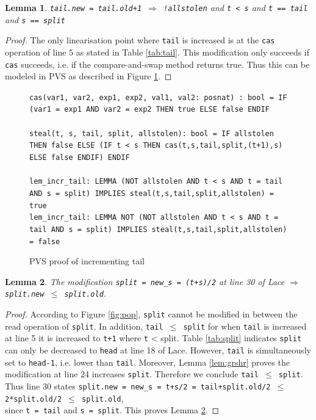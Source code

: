 \documentclass{sig-alternate-br}
\newtheorem{lemma}{Lemma}
\begin{document}
\begin{lemma}
	\texttt{tail.new = tail.old+1 $\Rightarrow$ !allstolen} and \texttt{t < s} and \texttt{t == tail} and \texttt{s == split}
	\label{lem:incrtail}
\end{lemma}
\begin{proof}
	The only linearisation point where \texttt{tail} is increased is at the \texttt{cas} operation of line 5 as stated in Table \ref{tab:tail}. This modification only succeeds if \texttt{cas} succeeds, i.e. if the compare-and-swap method returns true. Thus this can be modeled in PVS as described in Figure \ref{pvs:tailincr}.
\end{proof}
\begin{figure}[h]
	\texttt{cas(var1, var2, exp1, exp2, val1, val2: posnat) : bool = IF (var1 = exp1 AND var2 = exp2 THEN true ELSE false ENDIF}\\\\
	\texttt{steal(t, s, tail, split, allstolen): bool = IF allstolen THEN false ELSE (IF t < s THEN cas(t,s,tail,split,(t+1),s) ELSE false ENDIF) ENDIF}\\\\
	\texttt{lem\_incr\_tail: LEMMA (NOT allstolen AND t < s AND t = tail AND s = split) IMPLIES steal(t,s,tail,split,allstolen) = true}\\
	\texttt{lem\_incr\_tail: LEMMA NOT (NOT allstolen AND t < s AND t = tail AND s = split) IMPLIES steal(t,s,tail,split,allstolen) = false}
	\caption{PVS proof of incrementing tail}
	\label{pvs:tailincr}
\end{figure}

\begin{lemma}
	The modification \texttt{split = new\_s = (t+s)/2} at line 30 of Lace $\Rightarrow$ \texttt{split.new $\leq$ split.old}.
	\label{lem:lin30}
\end{lemma}
\begin{proof}
	According to Figure \ref{fig:pop}, \texttt{split} cannot be modified in between the read operation of \texttt{split}.
	In addition, \texttt{tail $\leq$ split} for when \texttt{tail} is increased at line 5 it is increased to \texttt{t+1} where \texttt{t} < split.
	Table \ref{tab:split} indicates \texttt{split} can only be decreased to \texttt{head} at line 18 of Lace.
	However, \texttt{tail} is simultaneously set to \texttt{head-1}, i.e. lower than \texttt{tail}.
	Moreover, Lemma \ref{lem:grshr} proves the modification at line 24 increases \texttt{split}.
	Therefore we conclude \texttt{tail $\leq$ split}.
	Thus line 30 states \texttt{split.new = new\_s = t+s/2 = tail+split.old/2 $\leq$ 2*split.old/2 $\leq$ split.old},\\since \texttt{t = tail} and \texttt{s = split}.
	This proves Lemma \ref{lem:lin30}.
\end{proof}
\end{document}
